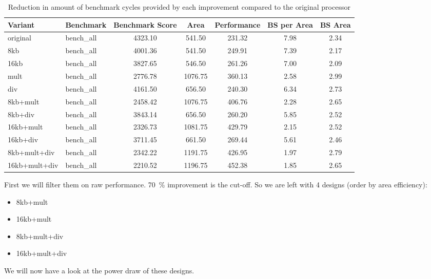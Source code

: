 \documentclass[final]{article}
\begin{document}
\begin{table}[H]
    \centering
    \caption{Reduction in amount of benchmark cycles provided by each improvement compared to the original processor}
    \label{tab:cycledecrease}
    \begin{tabular}{llS[table-format=4.2]S[table-format=4.2]S[table-format=4.2]S[table-format=4.2]S[table-format=4.2]}
        \toprule
        \textbf{Variant}   &  \textbf{Benchmark} & \textbf{Benchmark Score} & \textbf{Area} & \textbf{Performance} & \textbf{BS per Area} & \textbf{BS Area}\\
        \midrule
            original       & bench\_all &    4323.10 &     541.50 &     231.32 &       7.98 &       2.34 \\
            8kb            & bench\_all &    4001.36 &     541.50 &     249.91 &       7.39 &       2.17 \\
            16kb           & bench\_all &    3827.65 &     546.50 &     261.26 &       7.00 &       2.09 \\
            mult           & bench\_all &    2776.78 &    1076.75 &     360.13 &       2.58 &       2.99 \\
            div            & bench\_all &    4161.50 &     656.50 &     240.30 &       6.34 &       2.73 \\
            8kb+mult       & bench\_all &    2458.42 &    1076.75 &     406.76 &       2.28 &       2.65 \\
            8kb+div        & bench\_all &    3843.14 &     656.50 &     260.20 &       5.85 &       2.52 \\
            16kb+mult      & bench\_all &    2326.73 &    1081.75 &     429.79 &       2.15 &       2.52 \\
            16kb+div       & bench\_all &    3711.45 &     661.50 &     269.44 &       5.61 &       2.46 \\
            8kb+mult+div   & bench\_all &    2342.22 &    1191.75 &     426.95 &       1.97 &       2.79 \\
            16kb+mult+div  & bench\_all &    2210.52 &    1196.75 &     452.38 &       1.85 &       2.65 \\
        \bottomrule
    \end{tabular}
\end{table}

First we will filter them on raw performance.
\SI{70}{\percent} improvement is the cut-off.
So we are left with 4 designs (order by area efficiency):
\begin{itemize}
 \item 8kb+mult
 \item 16kb+mult
 \item 8kb+mult+div 
 \item 16kb+mult+div
\end{itemize}

We will now have a look at the power draw of these designs.
\end{document}
